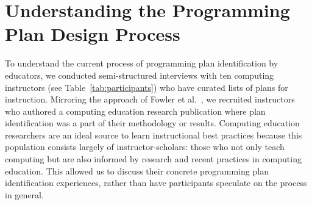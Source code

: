 
\section{Understanding the Programming Plan Design Process}
\label{sec:interview_results}
To understand the current process of programming plan identification by educators, we conducted semi-structured interviews with ten computing instructors (see Table~\ref{tab:participants}) who have curated lists of plans for instruction. Mirroring the approach of Fowler et al.~\cite{craig_max_methoda}, we recruited instructors who authored a computing education research publication where plan identification was a part of their methodology or results. Computing education researchers are an ideal source to learn instructional best practices because this population consists largely of instructor-scholars: those who not only teach computing but are also informed by research and recent practices in computing education. This allowed us to discuss their concrete programming plan identification experiences, rather than have participants speculate on the process in general.








